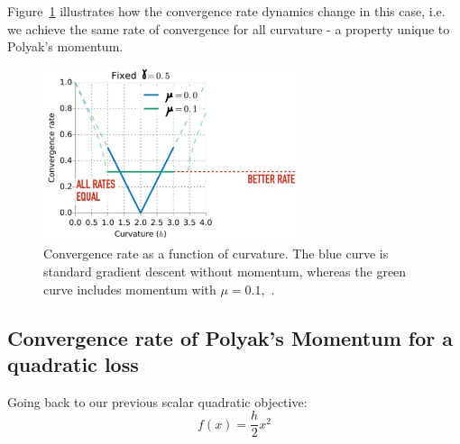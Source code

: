 \documentclass{article}
\begin{document}
Figure~\ref{fig:conv_momentum} illustrates how the convergence rate dynamics change in this case, i.e. we achieve the same rate of convergence for all curvature - a property unique to Polyak's momentum.

\begin{figure}[H]%
\centering%
\includegraphics[height=2in]{polyak.pdf}
\caption{Convergence rate as a function of curvature. The blue curve is standard gradient descent without momentum, whereas the green curve includes momentum with $\mu = 0.1$,~\cite{mitliagkas2019interesting}.}
\label{fig:conv_momentum}
\end{figure}

\subsection{Convergence rate of Polyak's Momentum for a quadratic loss}

Going back to our previous scalar quadratic objective:
\begin{equation}
	f(x) = \frac{h}{2} x^2
\end{equation}
\end{document}
